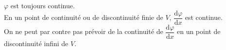 \documentclass[a4paper]{article}
\begin{document}
\pagestyle{fancy}
\fancyhf{}
\setlength{\headheight}{15pt}

\begin{center}
	\large{}
\end{center}


\(\varphi\) est toujours continue.\\
En un point de continuité ou de discontinuité finie de \(V\), \(\dfrac{\mathrm{d}\varphi}{\mathrm{d}x}\) est continue.\\
On ne peut par contre pas prévoir de la continuité de \(\dfrac{\mathrm{d}\varphi}{\mathrm{d}x}\) en un point de discontinuité infini de \(V\).
\end{document}
